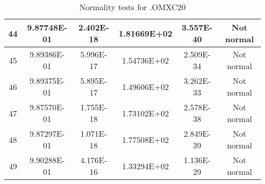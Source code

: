 \begin{table}[h]
\begin{tabular}{|c|c|c|c|c|c|}
		44 & 9.87748E-01 & 2.402E-18 & 1.81669E+02 & 3.557E-40 & Not normal\\\hline
		45 & 9.89386E-01 & 5.996E-17 & 1.54736E+02 & 2.509E-34 & Not normal\\\hline
		46 & 9.89375E-01 & 5.895E-17 & 1.49606E+02 & 3.262E-33 & Not normal\\\hline
		47 & 9.87570E-01 & 1.755E-18 & 1.73102E+02 & 2.578E-38 & Not normal\\\hline
		48 & 9.87297E-01 & 1.071E-18 & 1.77508E+02 & 2.849E-39 & Not normal\\\hline
		49 & 9.90288E-01 & 4.176E-16 & 1.33294E+02 & 1.136E-29 & Not normal\\\hline
	\end{tabular}
	\caption{Normality tests for .OMXC20}
\end{table}

